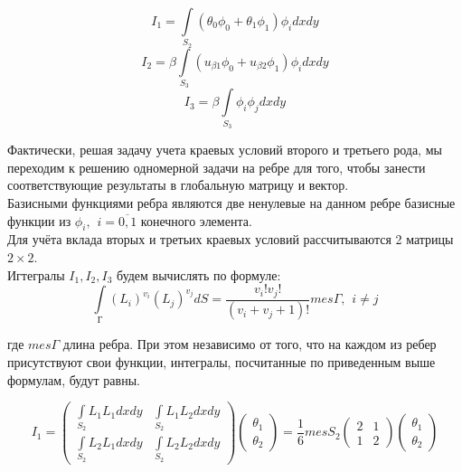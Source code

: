 \documentclass[12pt,a4paper]{article}
\begin{document}
$$ I_1 = \int \limits_{S_2} (\theta_0 \phi_0 + \theta_1 \phi_1) \phi_i dxdy $$
$$ I_2 = \beta \int \limits_{S_3} (u_{\beta 1} \phi_0 + u_{\beta 2} \phi_1) \phi_i dxdy $$
$$ I_3 = \beta \int \limits_{S_3} \phi_i \phi_j dxdy $$

\noindent Фактически, решая задачу учета краевых условий второго
и третьего рода, мы переходим к решению одномерной
задачи на ребре для того, чтобы занести соответствующие
результаты в глобальную матрицу и вектор. \\

\noindent Базисными функциями ребра являются две
ненулевые на данном ребре базисные функции из
$\phi_i, \hspace{5pt} i=\overline{0,1}$
конечного элемента. \\

\noindent Для учёта вклада вторых и третьих краевых условий
рассчитываются 2 матрицы $2 \times 2$. \\

\noindent Игтегралы $I_1, I_2, I_3$ будем вычислять по формуле:
$$
    \int \limits_Г (L_i)^{v_i} (L_j)^{v_j} dS =
    \frac{v_i ! v_j !}{(v_i + v_j + 1)!} mes \Gamma,
    \hspace{5pt} i \neq j
$$

\noindent где $mes \Gamma$ длина ребра. При этом независимо
от того, что на каждом из ребер присутствуют свои функции,
интегралы, посчитанные по приведенным выше формулам,
будут равны.

\renewcommand{\arraystretch}{1.25}
\begin{equation*}
    I_1 =
    \begin{pmatrix}
        \int \limits_{S_2} L_1L_1dxdy & \int \limits_{S_2} L_1L_2dxdy \\
        \int \limits_{S_2} L_2L_1dxdy & \int \limits_{S_2} L_2L_2dxdy
    \end{pmatrix}
    \begin{pmatrix}
        \theta_1 \\
        \theta_2
    \end{pmatrix}
    = \frac{1}{6} mes S_2
    \begin{pmatrix}
        2 & 1 \\
        1 & 2
    \end{pmatrix}
    \begin{pmatrix}
        \theta_1 \\
        \theta_2
    \end{pmatrix}
\end{equation*}
\renewcommand{\arraystretch}{1.0}
\end{document}
